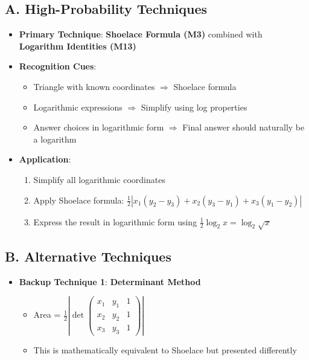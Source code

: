 \documentclass[12pt]{article}
\begin{document}
\begin{techniquesbox}
\subsection*{A. High-Probability Techniques}
\begin{itemize}[leftmargin=*]
    \item \textbf{Primary Technique}: \textbf{Shoelace Formula (M3)} combined with \textbf{Logarithm Identities (M13)}
    
    \item \textbf{Recognition Cues}: 
    \begin{itemize}
        \item Triangle with known coordinates $\Rightarrow$ Shoelace formula
        \item Logarithmic expressions $\Rightarrow$ Simplify using log properties
        \item Answer choices in logarithmic form $\Rightarrow$ Final answer should naturally be a logarithm
    \end{itemize}
    
    \item \textbf{Application}:
    \begin{enumerate}
        \item Simplify all logarithmic coordinates
        \item Apply Shoelace formula: $\frac{1}{2}|x_1(y_2-y_3) + x_2(y_3-y_1) + x_3(y_1-y_2)|$
        \item Express the result in logarithmic form using $\frac{1}{2}\log_2 x = \log_2 \sqrt{x}$
    \end{enumerate}
\end{itemize}

\subsection*{B. Alternative Techniques}
\begin{itemize}[leftmargin=*]
    \item \textbf{Backup Technique 1}: \textbf{Determinant Method}
    \begin{itemize}
        \item Area = $\frac{1}{2}\left|\det\begin{pmatrix} x_1 & y_1 & 1 \\ x_2 & y_2 & 1 \\ x_3 & y_3 & 1 \end{pmatrix}\right|$
        \item This is mathematically equivalent to Shoelace but presented differently
    \end{itemize}
    

\end{itemize}
\end{techniquesbox}
\end{document}
